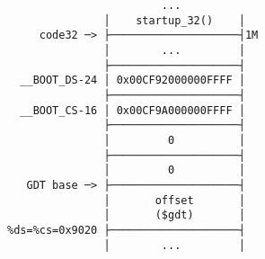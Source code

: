 \documentclass[varwidth,crop]{standalone}
\begin{document}
\begin{verbatim}
                        ...         
               │    startup_32()    │
     code32 ─> ├────────────────────┤1M
               │        ...         │
               ├────────────────────┤
  __BOOT_DS-24 │ 0x00CF92000000FFFF │
               ├────────────────────┤
  __BOOT_CS-16 │ 0x00CF9A000000FFFF │
               ├────────────────────┤
               │         0          │
               ├────────────────────┤
               │         0          │
   GDT base ─> ├────────────────────┤
               │       offset       │
               │       ($gdt)       │
%ds=%cs=0x9020 ├────────────────────┤
               │        ...         │
\end{verbatim}
\end{document}
